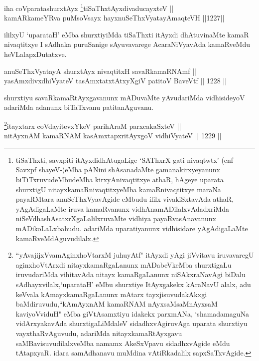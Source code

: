 \begin{shl}
iha coVparatashurxtAyx \footnote{tiSaThxti, savxpiti itAyxdidhAtugaLige `SAThxrX gati nivaqtwtx' (cnf Savxpf shayeV-)eMba pANini shAsanadaMte gamanakirxyeyanunx biTiTxruvudeMbudeMba kirxyAnivaqtitxye athaR, hAgeye uparata shurxtigU nitayxkamaRnivaqtitxyeMba kamaRnivaqtitxye maraNa payaRMtara anuSeThxVyavAgide eMbudu ililx vivakiSxtavAda athaR, yAgAdigaLaMte iruva kamaRvanunx vidhAnamADilalxvAdadxriMda niSeVdhashAsatxrXgaLalilxruvaMte vidhiya payaRvasAnavanunx mADikoLaLxbahudu. adariMda uparatiyanunx vidhisidare yAgAdigaLaMte kamaRveMdAguvudilalx.}tiSaThxtAyxdivaducayxteV || \\
kamARkameYRva puMsoV\s sayx hayxnuSeThxVyatayA\s \s maqteVH \hfill ||1227||  
\end{shl}

\begin{artha}
ililxyU `uparataH' eMba shurxtiyiMda tiSaThxti itAyxdi dhAtuvinaMte kamaR nivaqtitxye I sAdhaka puruSanige sAyuvavarege AcaraNiVyavAda kamaRveMdu heVLalapxDutatxve.
\end{artha}


\begin{shl}
anuSeThxVyatayA shurxtAyx nivaqtitxH savaRkamaRNAmf || \\
yasAmxdivxdhiVyateV tasAmxtatxtAtxyXgiV patitoV BaveVtf \hfill || 1228 ||  
\end{shl}

\begin{artha}
shurxtiyu savaRkamaRtAyxgavanunx mADuvaMte yAvudariMda vidhisideyoV adariMda adanunx biTaTxvanu patitanAguvanu.
\end{artha}




\begin{shl}
\footnote{``yAvajijxVvamAginxhoVtarxM juhuyAtf" itAyxdi yAgi jiVvitavu iruvavaregU aginxhoVtArxdi nitayxkamaRgaLanunx mADabeVkeMba shurxtigaLu iruvudariMda vihitavAda nitayx kamaRgaLanunx niSAkxraNavAgi biDalu sAdhayxvilalx,`uparataH' eMbu shurxtiye ItAyxgakekx kAraNavU alalx, adu keVvala kAmayxkamaRgaLanunx mAtarx tayxjisuvudakAkxgi baMdiruvudu,``kAmAyxnAM kamaRNAM nAyxsaM\break saMnAyxsaM kaviyoVviduH" eMba giVtAsamxtiyu idakekx parxmANa, `shamadamaguNa vidArxyakavAda shurxtigaLiMdaleV sidadhxvAgiruvAga uparata shurxtiyu vayxthaRvAguvudu, adariMda nitayxkamaRtAyxgavu saMBavisuvudilalxveMba namamx AkeSxVpavu sidadhxvAgide eMdu tAtapxyaR. idara samAdhanavu muMdina vAtiRkadalilx sapxSaTxvAgide.}itayxtarx coVdayitevxYkeV parihAraM parxcakaSxteV || \\
nitAyxnAM kamaRNAM kasAmxtapxritAyxgoV vidhiVyateV \hfill || 1229 ||  
\end{shl}
				
